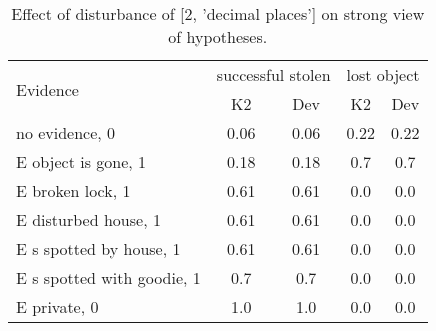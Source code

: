 \begin{table}\begin{tabular}{l|cc|cc}\toprule\multirow{2}{*}{Evidence} & \multicolumn{2}{c}{successful stolen}& \multicolumn{2}{c}{lost object}\\& {K2} & {Dev}& {K2} & {Dev}\\\midrule
no evidence, 0 & 0.06&0.06&0.22&0.22\\E object is gone, 1 & 0.18&0.18&0.7&0.7\\E broken lock, 1 & 0.61&0.61&0.0&0.0\\E disturbed house, 1 & 0.61&0.61&0.0&0.0\\E s spotted by house, 1 & 0.61&0.61&0.0&0.0\\E s spotted with goodie, 1 & 0.7&0.7&0.0&0.0\\E private, 0 & 1.0&1.0&0.0&0.0\\\bottomrule\end{tabular}\caption{Effect of disturbance of [2, 'decimal places'] on strong view of hypotheses.}\end{table}